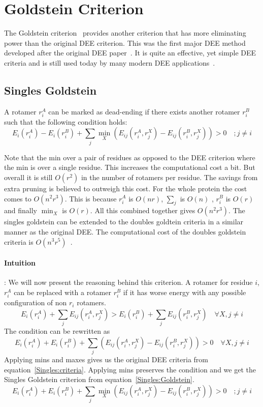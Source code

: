 \documentclass{article}
\begin{document}
\section{Goldstein Criterion}
The Goldstein criterion~\cite{Goldstein1994} provides another criterion that has more eliminating power than the original DEE criterion. This was the first major DEE method developed after the original DEE paper~\cite{Desmet1992}. It is quite an effective, yet simple DEE criteria and is still used today by many modern DEE applications~\cite{Fromer2010}. 

\subsection{Singles Goldstein}
A rotamer $r_i^A$ can be marked as dead-ending if there exists another rotamer $r_i^B$ such that the following condition holds:
\begin{equation}
\label{Singles:Goldstein}
E_i(r_i^A) - E_i(r_i^B) + \sum_j \min_X \left(E_{ij}(r_i^A,r_j^X)-E_{ij}(r_i^B,r_j^X) \right) > 0  \quad   ; j \neq i
\end{equation}

Note that the min over a pair of residues as opposed to the DEE criterion where the min is over a single residue. This increases the computational cost a bit. But overall it is still $O(r^2)$ in the number of rotamers per residue. The savings from extra pruning is believed to outweigh this cost. For the whole protein the cost comes to $O(n^2r^3)$. This is because $r_i^A$ is $O(nr)$, $\sum_j$ is $O(n)$ , $r_i^B$ is $O(r)$ and finally $\min_X$ is $O(r)$. All this combined together gives $O(n^2r^3)$. The singles goldstein can be extended to the doubles goldtein criteria in a similar manner as the original DEE. The computational cost of the doubles goldstein criteria is $O(n^3r^5)$~\cite{Pierce2000}. 

\paragraph{Intuition}: We will now present the reasoning behind this criterion. A rotamer for residue $i$, $r_i^A$ can be replaced with a rotamer $r_i^B$ if it has worse energy with any possible configuration of non $r_i$ rotamers. 
\[
E_i(r_i^A) + \sum_j E_{ij}(r_i^A,r_j^X) >  E_i(r_i^B) + \sum_j E_{ij}(r_i^B,r_j^X) \quad \forall X, j\neq i
\]
The condition can be rewritten as
\[
E_i(r_i^A) + E_i(r_i^B) + \sum_j \left( E_{ij}(r_i^A,r_j^X) - E_{ij}(r_i^B,r_j^X) \right) >  0 \quad \forall X, j \neq i
\]
Applying mins and maxes gives us the original DEE criteria from equation~\ref{Singles:criteria}. Applying mins preserves the condition and we get the Singles Goldstein criterion from equation~\ref{Singles:Goldstein}.
\[
E_i(r_i^A) + E_i(r_i^B) + \sum_j \min_X \left( E_{ij}(r_i^A,r_j^X) - E_{ij}(r_i^B,r_j^X) \right) >  0 \quad ;j\neq i
\]
\end{document}
